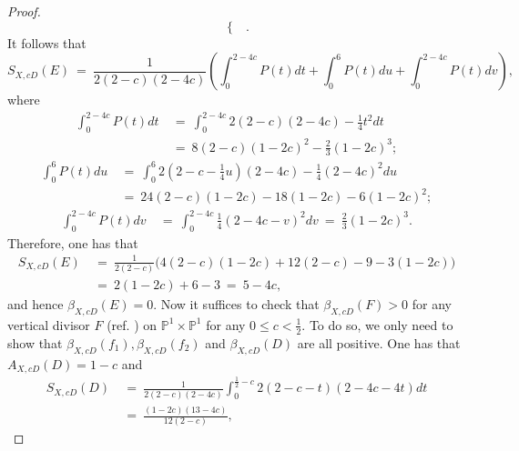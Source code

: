 \documentclass[a4paper,12pt]{amsart}
\newcommand{\bP}{{\mathbb P}}
\theoremstyle{definition}
\theoremstyle{remark}
\begin{document}
\begin{proof}
\begin{equation}
\begin{cases}
        \end{cases}.
    \end{equation}
It follows that $$S_{X,cD}(E)\ =\ \frac{1}{2(2-c)(2-4c)}\left( \int_0^{2-4c}P(t)dt+ \int_0^{6}P(t)du+\int_0^{2-4c}P(t)dv\right),$$ where 
\begin{equation}\nonumber
\begin{split}
        \int_0^{2-4c}P(t)dt & \ =\     \int_0^{2-4c}2(2-c)(2-4c)-\frac{1}{4}t^2dt \\
        & \ =\ 8(2-c)(1-2c)^2-\frac{2}{3}(1-2c)^3;  
\end{split}
\end{equation}
\begin{equation}\nonumber
\begin{split}
        \int_0^{6}P(t)du & \ =\     \int_0^{6}2(2-c-\frac{1}{4}u)(2-4c)-\frac{1}{4}(2-4c)^2du \\
        & \ =\ 24(2-c)(1-2c)-18(1-2c)-6(1-2c)^2;  
\end{split}
\end{equation}
\begin{equation}\nonumber
\begin{split}
        \int_0^{2-4c}P(t)dv & \ =\     \int_0^{2-4c}\frac{1}{4}(2-4c-v)^2dv \ = \ \frac{2}{3}(1-2c)^3.  
\end{split}
\end{equation}
Therefore, one has that 
\begin{equation}\nonumber
    \begin{split}
        S_{X,cD}(E)& \ =\ \frac{1}{2(2-c)}\big( 4(2-c)(1-2c)+12(2-c)-9-3(1-2c) \big)\\
        & \ = \ 2(1-2c)+6-3 \ = \ 5-4c, 
    \end{split}
\end{equation}
and hence $\beta_{X,cD}(E)=0$. Now it suffices to check that $\beta_{X,cD}(F)>0$ for any vertical divisor $F$ (ref. \cite[Definition 1.26]{ACC23}) on $\bP^1\times\bP^1$ for any $0\leq c<\frac{1}{2}$. To do so, we only need to show that $\beta_{X,cD}(f_1),\beta_{X,cD}(f_2)$ and $\beta_{X,cD}(D)$ are all positive. One has that $A_{X,cD}(D)=1-c$ and \begin{equation}\nonumber
    \begin{split}
        S_{X,cD}(D)& \ =\ \frac{1}{2(2-c)(2-4c)}\int_0^{\frac{1}{2}-c}2(2-c-t)(2-4c-4t)dt\\
        & \ = \ \frac{(1-2c)(13-4c)}{12(2-c)},
    \end{split}
\end{equation}

\end{proof}
\end{document}
